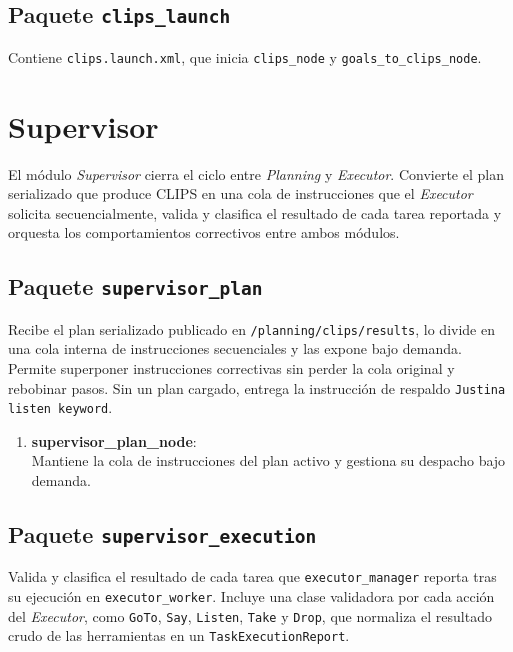 
\subsection{Paquete \texttt{clips\_launch}}
Contiene \texttt{clips.launch.xml}, que inicia \texttt{clips\_node} y \texttt{goals\_to\_clips\_node}.


\section[Supervisor]{Supervisor}
\label{app:justina_supervisor}

El módulo \textit{Supervisor} cierra el ciclo entre \textit{Planning} y \textit{Executor}. Convierte el plan serializado que produce CLIPS en una cola de instrucciones que el \textit{Executor} solicita secuencialmente, valida y clasifica el resultado de cada tarea reportada y orquesta los comportamientos correctivos entre ambos módulos.


\subsection{Paquete \texttt{supervisor\_plan}}
Recibe el plan serializado publicado en \texttt{/planning/clips/results}, lo divide en una cola interna de instrucciones secuenciales y las expone bajo demanda. Permite superponer instrucciones correctivas sin perder la cola original y rebobinar pasos. Sin un plan cargado, entrega la instrucción de respaldo \texttt{Justina listen keyword}.

\begin{enumerate}
    \item \textbf{supervisor\_plan\_node}: \\
    Mantiene la cola de instrucciones del plan activo y gestiona su despacho bajo demanda.
\end{enumerate}


\subsection{Paquete \texttt{supervisor\_execution}}
Valida y clasifica el resultado de cada tarea que \texttt{executor\_manager} reporta tras su ejecución en \texttt{executor\_worker}. Incluye una clase validadora por cada acción del \textit{Executor}, como \texttt{GoTo}, \texttt{Say}, \texttt{Listen}, \texttt{Take} y \texttt{Drop}, que normaliza el resultado crudo de las herramientas en un \texttt{TaskExecutionReport}.

